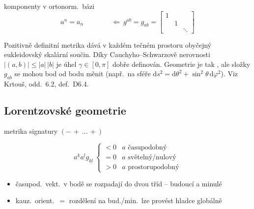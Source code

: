 komponenty v ortonorm.\ bázi
\[
  a^n = a_n \qquad\qquad \Leftarrow\ g^{ab} = g_{ab} = \begin{bmatrix}1 & & \\ & 1 & \\ & & \ddots\end{bmatrix}
\]

\begin{vysvetleni}
Pozitivně definitní metrika dává v každém tečném prostoru obyčejný eukleidovský skalární součin. Díky Cauchyho--Schwarzově nerovnosti $|(a,b)|\le|a|\,|b|$ je úhel $\gamma\in[0,\pi]$ dobře definován. Geometrie je tak , ale složky $g_{ab}$ se mohou bod od bodu měnit (např.\ na sféře $\mathrm{d}s^2=\mathrm{d}\theta^2+\sin^2\!\theta\,\mathrm{d}\varphi^2$). Viz Krtouš, odd.~6.2, def.~D6.4.
\end{vysvetleni}

\subsection{Lorentzovské geometrie} 

\begin{minipage}{0.64\textwidth}
\begin{definice}
metrika signatury $(-\,+\,\dots\,+)$
\end{definice}
\[
  a^{\underline{k}}a^{\underline{l}}g_{\underline{kl}}
  \ \begin{cases}
    <0 & a \text{ časupodobný} \\
    =0 & a \text{ světelný/nulový} \\
    >0 & a \text{ prostorupodobný}
  \end{cases}
\]
\begin{itemize}[nosep]
  \item[] časupod.\ vekt.\ v bodě se rozpadají do dvou tříd -- budoucí a minulé
  \item[] kauz.\ orient.\ $=$ rozdělení na bud./min.\ lze provést hladce globálně
\end{itemize}
\end{minipage}
\hfill
\begin{minipage}{0.34\textwidth}
\end{minipage}

